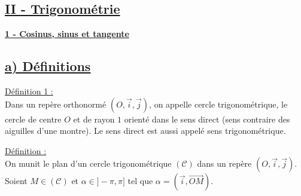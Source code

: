 \documentclass[12pt,a4paper]{article}
\begin{document}
    \subsection*{%
    \color{monRouge} \underline{II - Trigonométrie}%
}


\noindent \textbf{\textcolor{monRouge}{\underline{1 - Cosinus, sinus et tangente}}}

\subsection*{%
    \color{monRouge} \underline{a) Définitions}%
}

\noindent \textcolor{monRouge}{\underline{Définition 1 :}} \\
Dans un repère orthonormé $(O, \vec{i}, \vec{j})$, on appelle \textcolor{monRouge}{cercle trigonométrique}, le cercle de centre $O$ et de rayon $1$ orienté dans le \textcolor{monRouge}{sens direct} (sens contraire des aiguilles d'une montre). Le sens direct est aussi appelé sens trigonométrique.

\begin{center}
\end{center}

\noindent \textcolor{monRouge}{\underline{Définition :}} \\
On munit le plan d'un cercle trigonométrique $(\mathcal{C})$ dans un repère $(O, \vec{i}, \vec{j})$. \\
Soient $M \in (\mathcal{C})$ et $\alpha \in ]-\pi, \pi]$ tel que $\alpha = (\vec{i}, \overrightarrow{OM})$.
\end{document}
